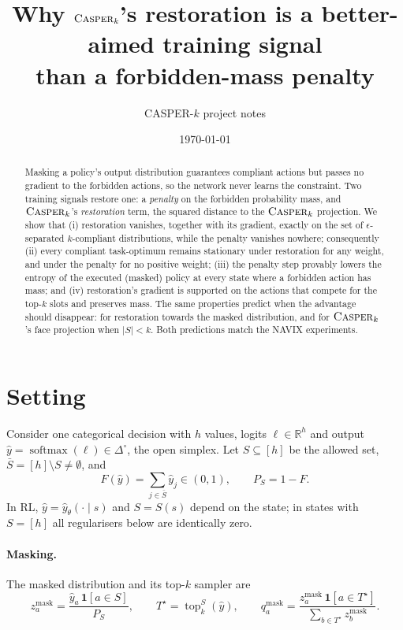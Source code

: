 \documentclass[11pt]{article}
\title{Why $\casper_k$'s restoration is a better-aimed training signal\\ than a forbidden-mass penalty}
\author{CASPER-$k$ project notes}
\date{\today}
\providecommand{\casper}{\textnormal{\textsc{Casper}}}
\providecommand{\R}{\mathbb{R}}
\newcommand{\topkS}{\operatorname{top}_k^S}
\newcommand{\yh}{\hat y}
\newcommand{\zm}{z^{\mathrm{mask}}}
\newcommand{\Sb}{\bar S}
\newcommand{\1}{\mathbf 1}
\theoremstyle{definition}
\theoremstyle{remark}
\begin{document}
\maketitle

\begin{abstract}
Masking a policy's output distribution guarantees compliant actions but passes no gradient to the
forbidden actions, so the network never learns the constraint. Two training signals restore one:
a \emph{penalty} on the forbidden probability mass, and $\casper_k$'s \emph{restoration} term, the
squared distance to the $\casper_k$ projection. We show that (i) restoration vanishes, together with
its gradient, exactly on the set of $\epsilon$-separated $k$-compliant distributions, while the
penalty vanishes nowhere; consequently (ii) every compliant task-optimum remains stationary under
restoration for any weight, and under the penalty for no positive weight; (iii) the penalty step
provably lowers the entropy of the executed (masked) policy at every state where a forbidden action
has mass; and (iv) restoration's gradient is supported on the actions that compete for the top-$k$
slots and preserves mass. The same properties predict when the advantage should disappear: for
restoration towards the masked distribution, and for $\casper_k$'s face projection when $|S|<k$.
Both predictions match the NAVIX experiments.
\end{abstract}

\section{Setting}
\label{sec:setting}

Consider one categorical decision with $h$ values, logits $\ell\in\R^h$ and output
$\yh=\operatorname{softmax}(\ell)\in\Delta^\circ$, the open simplex. Let $S\subseteq[h]$ be the
allowed set, $\Sb=[h]\setminus S\neq\emptyset$, and
\[
F(\yh)=\sum_{j\in\Sb}\yh_j\in(0,1),\qquad P_S=1-F .
\]
In RL, $\yh=\yh_\theta(\cdot\mid s)$ and $S=S(s)$ depend on the state; in states with $S=[h]$ all
regularisers below are identically zero.

\paragraph{Masking.} The masked distribution and its top-$k$ sampler are
\[
\zm_a=\frac{\yh_a\,\1[a\in S]}{P_S},\qquad
T^\star=\topkS(\yh),\qquad
q^{\mathrm{mask}}_a=\frac{\zm_a\,\1[a\in T^\star]}{\sum_{b\in T^\star}\zm_b}.
\]
\end{document}
